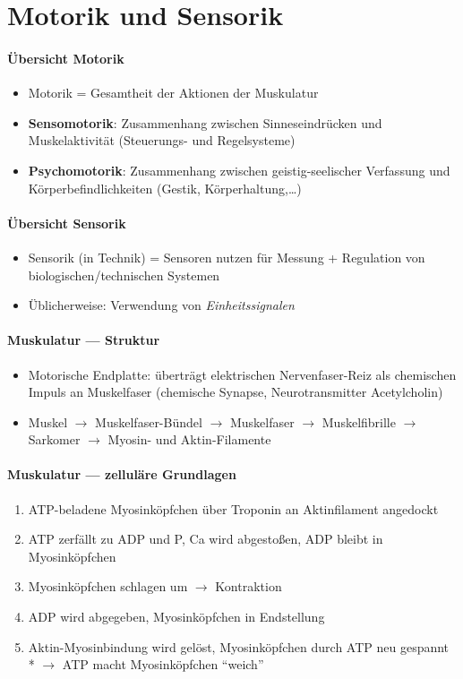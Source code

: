 \section*{Motorik und Sensorik}

\paragraph{Übersicht Motorik}
\begin{itemize}
  \item Motorik = Gesamtheit der Aktionen der Muskulatur
  \item \textbf{Sensomotorik}: Zusammenhang zwischen Sinneseindrücken und Muskelaktivität (Steuerungs- und Regelsysteme)
  \item \textbf{Psychomotorik}: Zusammenhang zwischen geistig-seelischer Verfassung und Körperbefindlichkeiten (Gestik, Körperhaltung,\dots)
\end{itemize}

\paragraph{Übersicht Sensorik}
\begin{itemize}
  \item Sensorik (in Technik) = Sensoren nutzen für Messung + Regulation von biologischen/technischen Systemen
  \item Üblicherweise: Verwendung von \emph{Einheitssignalen}
\end{itemize}

\paragraph{Muskulatur --- Struktur}
\begin{itemize}
  \item Motorische Endplatte: überträgt elektrischen Nervenfaser-Reiz als chemischen Impuls an Muskelfaser (chemische Synapse, Neurotransmitter Acetylcholin)
  \item Muskel \( \to \) Muskelfaser-Bündel \( \to \) Muskelfaser \( \to \) Muskelfibrille \( \to \) Sarkomer \( \to \) Myosin- und Aktin-Filamente
\end{itemize}

\paragraph{Muskulatur --- zelluläre Grundlagen}
\begin{enumerate}
  \item ATP-beladene Myosinköpfchen über Troponin an Aktinfilament angedockt
  \item ATP zerfällt zu ADP und P, Ca wird abgestoßen, ADP bleibt in Myosinköpfchen
  \item Myosinköpfchen schlagen um \( \to \) Kontraktion
  \item ADP wird abgegeben, Myosinköpfchen in Endstellung
  \item Aktin-Myosinbindung wird gelöst, Myosinköpfchen durch ATP neu gespannt \\* \( \to \) ATP macht Myosinköpfchen ``weich''
\end{enumerate}

